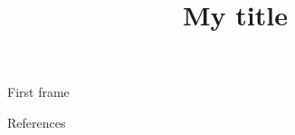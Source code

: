 \documentclass[aspectratio=169]{beamer}
\title{My title}
\begin{document}
\maketitle

\begin{frame}{First frame}
\end{frame}

\appendix
\begin{frame}[allowframebreaks]{References}


\end{frame}
\end{document}
